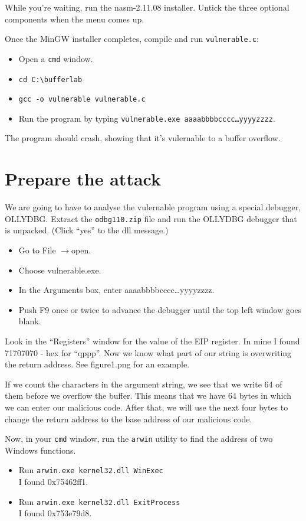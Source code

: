 \documentclass{article}
\begin{document}
While you're waiting, run the nasm-2.11.08 installer.  Untick the three optional components when the 
menu comes up.

Once the MinGW installer completes, compile and run \texttt{vulnerable.c}:
\begin{itemize}
	\item Open a \texttt{cmd} window.
	\item \texttt{cd C:\textbackslash{}bufferlab}
	\item \texttt{gcc -o vulnerable vulnerable.c}
	\item Run the program by typing \texttt{vulnerable.exe aaaabbbbcccc\ldots yyyyzzzz}.
	\end{itemize}

The program should crash, showing that it's vulernable to a buffer overflow.

\section{Prepare the attack}
We are going to have to analyse the vulernable program using a special debugger, OLLYDBG.  Extract
the \texttt{odbg110.zip} file and run the OLLYDBG debugger that is unpacked. (Click ``yes'' to 
the dll message.)

\begin{itemize}
	\item Go to File $\rightarrow$open.
	\item Choose vulnerable.exe.
	\item In the Arguments box, enter aaaabbbbcccc\ldots yyyyzzzz.
	\item Push F9 once or twice to advance the debugger until the top left window 
		goes blank.
\end{itemize}
Look in the ``Registers'' window for the value of the EIP register.  In mine I found 
71707070 - hex for ``qppp''. Now we know what part of our string is overwriting the return address. See figure1.png for an example.

If we count the characters in the argument string, we see that we write 64 of them before we overflow 
the buffer.  This means that we have 64 bytes in which we can enter our malicious code.  After that, we will use the next four bytes to change the return address to the base address of our malicious code.

Now, in your \texttt{cmd} window, run the \texttt{arwin} utility to find the address of two 
Windows functions.

\begin{itemize}
	\item Run \texttt{arwin.exe kernel32.dll WinExec} \\
		I found 0x75462ff1.
	\item Run \texttt{arwin.exe kernel32.dll ExitProcess} \\
		I found 0x753e79d8.
\end{itemize}
\end{document}
